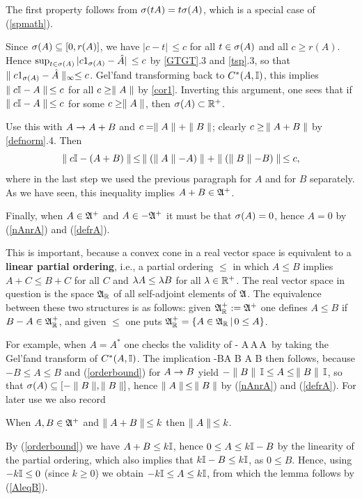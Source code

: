 The first property follows from $\sigma(tA)=t\sigma(A)$, which is a special
case of (\ref{spmath}).

Since $\sigma(A)\subseteq [0,r(A)]$, we have $|c-t|\,\leq c$ for all
$t\in \sigma(A)$ and all $c\geq r(A)$. Hence $\sup_{t\in
\sigma(A)}|c1_{\sigma(A)}-\hat{A}|\,\leq c$ by \ref{GTGT}.3 and \ref{tsp}.3,
so that $\parallel c1_{\sigma(A)}-\hat{A}\parallel_{\infty}\leq c$.  Gel'fand
transforming back to $C^*(A,{\Bbb I})$, this implies $\parallel c{\Bbb I}-A\parallel\,\leq c$
for all $c\geq \parallel A\parallel$ by \ref{cor1}. Inverting this argument, one
sees that if $\parallel c{\Bbb I}-A\parallel\,\leq c$ for some $c\geq \parallel A\parallel$, then
$\sigma(A)\subset{\Bbb R}^+$.

Use this with $A\rightarrow A+B$ and $c=\parallel A\parallel+\parallel B\parallel$; clearly $c\geq \,\parallel
A+B\parallel$ by \ref{defnorm}.4. Then
$$
\parallel c{\Bbb I}-(A+B)\parallel\,\leq\,\parallel(\parallel A\parallel-A)\parallel+\parallel(\parallel B\parallel-B)\parallel\,\leq c,
$$ where in the last step we used the previous paragraph for $A$ and
for $B$ separately.  As we have seen, this inequality implies
$A+B\in{\frak A}^+$.

Finally, when $A\in{\frak A}^+$ and $A\in -{\frak A}^+$ it must be that $\sigma(A)=0$,
hence $A=0$ by (\ref{nAnrA}) and (\ref{defrA}).  \enp

This is important, because a convex cone in a real vector space is
equivalent to a {\bf linear partial ordering}, i.e., a partial
ordering $\leq$ in which $A\leq B$ implies $A+C\leq B+C$ for all $C$
and $\lambda A\leq\lambda B$ for all $\lambda\in{\Bbb R}^+$. The real vector space in
question is the space ${\frak A}_{\Bbb R}$ of all self-adjoint elements of ${\frak A}$. The
equivalence between these two structures is as follows: given
${\frak A}_{\Bbb R}^+:={\frak A}^+$ one defines $A\leq B$ if $B-A\in{\frak A}_{\Bbb R}^+$, and given $\leq$
one puts ${\frak A}_{\Bbb R}^+=\{A\in{\frak A}_{\Bbb R}\, |\, 0\leq A\}$.

For example, when $A=A^*$ one checks the validity of \be -\n
A\n\,\I\leq A\leq\,\n A\n\,\I {} \ee by taking the
Gel'fand transform of $C^*(A,{\Bbb I})$. The implication \be -B\leq A\leq
B\:\:\Longrightarrow\: \n A\n\,\leq\,\n B\n {} \ee then
follows, because $-B\leq A\leq B$ and (\ref{orderbound}) for $A\rightarrow B$
yield $-\parallel B\parallel\,{\Bbb I}\leq A\leq\,\parallel B\parallel\,{\Bbb I}$, so that $\sigma(A)\subseteq
[-\parallel B\parallel, \parallel B\parallel]$, hence $\parallel A\parallel\,\leq\,\parallel B\parallel$ by (\ref{nAnrA}) and
(\ref{defrA}). For later use we also record
\begin{Lemma}
When $A,B\in{\frak A}^+$ and $\parallel A+B\parallel\,\leq k$ then $\parallel A\parallel\,\leq
k$. \end{Lemma}

By (\ref{orderbound}) we have $A+B\leq k{\Bbb I}$, hence $0\leq A\leq k{\Bbb I}-B$
by the linearity of the partial ordering, which also implies that
$k{\Bbb I}-B\leq k{\Bbb I}$, as $0\leq B$. Hence, using $-k{\Bbb I}\leq 0$ (since $k\geq
0$) we obtain $-k{\Bbb I}\leq A\leq k{\Bbb I}$, from which the lemma follows by
(\ref{AleqB}).\enp

